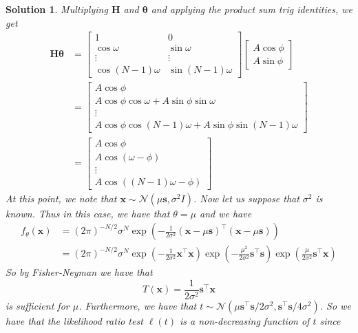 \documentclass[a4paper]{article}
\newtheorem*{sol}{Solution}
\begin{document}
\begin{sol}
  Multiplying $\bm{H}$ and $\bm{\theta}$ and applying the product sum trig identities, we get 
  \[
    \begin{aligned}
      \bm{H}\bm{\theta} &=
  \begin{bmatrix}
    1 & 0 \\
    \cos \omega & \sin \omega \\
    \vdots & \vdots \\
    \cos (N-1)\omega & \sin(N-1) \omega
  \end{bmatrix}
  \begin{bmatrix}
    A \cos \phi \\
    A \sin \phi
  \end{bmatrix} \\
                        &= \begin{bmatrix}
    A \cos \phi \\
    A\cos \phi \cos \omega + A \sin \phi \sin \omega \\
    \vdots \\
    A\cos \phi \cos(N-1)\omega + A\sin \phi \sin (N-1)\omega
  \end{bmatrix} \\
                        &=
  \begin{bmatrix}
    A \cos \phi \\
    A \cos (\omega - \phi) \\
    \vdots \\
    A \cos ((N-1)\omega - \phi)
  \end{bmatrix}
    \end{aligned}
  \]
  At this point, we note that $\bm{x} \sim \mathcal{N}(\mu \bm{s}, \sigma^2 I)$. Now let us suppose that $\sigma^2$ is known. Thus in this case, we have that $\theta = \mu$ and we have 
  \[
    \begin{aligned}
      f_{\theta}(\bm{x}) &= (2\pi)^{-N/2} \sigma^N \exp \left( -\frac{1}{2\sigma^2} (\bm{x} - \mu \bm{s})^\top (\bm{x} - \mu \bm{s}) \right) \\
                         &=  (2\pi)^{-N/2} \sigma^N  \exp \left( -\frac{1}{2\sigma^2} \bm{x}^\top\bm{x} \right) \exp \left( -\frac{\mu^2}{2\sigma^2} \bm{s}^\top \bm{s}  \right) \exp \left( \frac{\mu}{2\sigma^2} \bm{s}^\top \bm{x} \right)
    \end{aligned}
  \]
  So by Fisher-Neyman we have that
  \[
    T(\bm{x}) = \frac{1}{2\sigma^2}\bm{s}^\top \bm{x}
  \]
  is sufficient for $\mu$. Furthermore, we have that $t \sim \mathcal{N}(\mu \bm{s}^\top \bm{s}/2\sigma^2, \bm{s}^\top \bm{s}/4\sigma^2)$. So we have that the likelihood ratio test $\ell(t)$ is a non-decreasing function of $t$ since

\end{sol}
\end{document}
